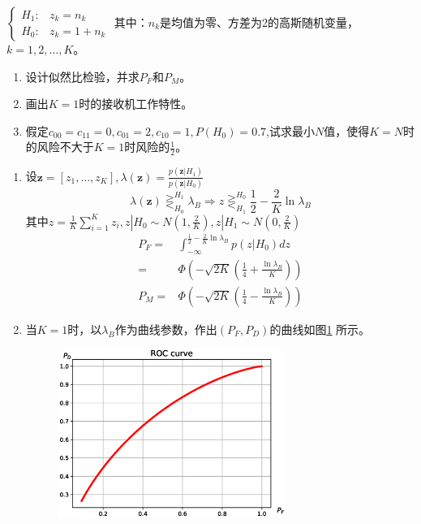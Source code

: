 \documentclass{article}
\begin{document}
\begin{enumerate}
$\begin{cases}
H_1 : & z_k = n_k \\
H_0 : & z_k = 1 + n_k
\end{cases}$
其中：$n_k$是均值为零、方差为2的高斯随机变量，$k=1,2,\dots,K$。
\begin{enumerate}[label=(\alph*)]
\item 设计似然比检验，并求$P_F$和$P_M$。
\item 画出$K=1$时的接收机工作特性。
\item 假定$c_{00}=c_{11}=0,c_{01}=2,c_{10}=1,P(H_0)=0.7$,试求最小$N$值，使得$K=N$时的风险不大于$K=1$时风险的$\frac{1}{2}$。
\end{enumerate}
\begin{solution}
\begin{enumerate}[label=(\alph*)]
\item 设$\bm{z}=[z_1,\dots,z_K],\lambda(\bm{z})=\frac{p(\bm{z}|H_1)}{p(\bm{z}|H_0)}$
$$
\lambda(\bm{z})\mathop{\gtreqless}_{H_0}^{H_1} \lambda_B \Rightarrow z \mathop{\gtreqless}_{H_1}^{H_0} \frac{1}{2}-\frac{2}{K}\ln \lambda_B
$$
其中$z=\frac{1}{K}\sum_{i=1}^K z_i,z|H_0 \sim N(1,\frac{2}{K}),z|H_1 \sim N(0,\frac{2}{K})$
\begin{align*}
P_F = & \int_{-\infty}^{\frac{1}{2}-\frac{2}{K}\ln \lambda_B} p(z|H_0)dz \\
    = & \Phi\left(-\sqrt{2K}(\frac{1}{4}+\frac{\ln \lambda_B}{K})\right) \\
P_M = & \Phi\left(-\sqrt{2K}(\frac{1}{4}-\frac{\ln \lambda_B}{K})\right)
\end{align*}
\item 当$K=1$时，以$\lambda_B$作为曲线参数，作出$(P_F,P_D)$的曲线如图\ref{fig:ROC_curve} 所示。

\begin{figure}[!ht]
\centering
\includegraphics[width=0.7\textwidth]{ROC_curve.eps}
\caption{}\label{fig:ROC_curve}
\end{figure}


\end{enumerate}
\end{solution}
\end{enumerate}
\end{document}
